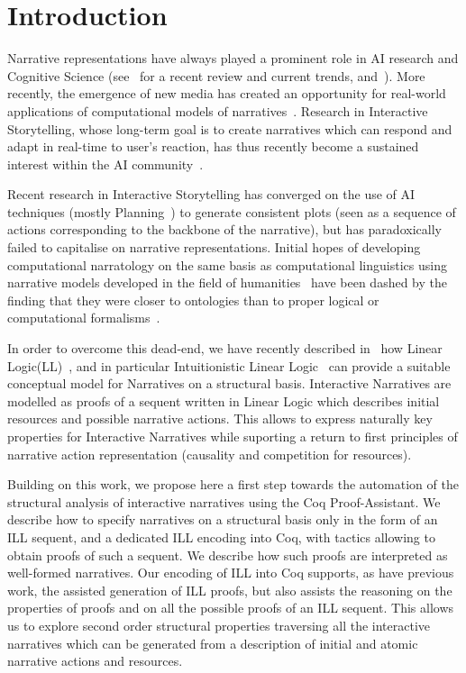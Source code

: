 \documentclass[runningheads,a4paper]{llncs}
\begin{document}
\section{Introduction}
%
Narrative representations have always played a prominent role in AI research and Cognitive Science (see~\cite{Richards09} for a recent review and current trends, and~\cite{AAAI10}). More recently, the emergence of new media has created an opportunity for real-world applications of computational models of narratives~\cite{Laurel93,Murray98}. Research in Interactive Storytelling, whose long-term goal is to create narratives which can respond and adapt in real-time to user's reaction, has thus recently become a sustained interest within the AI community~\cite{AAAI07,AAAI09}.

Recent research in Interactive Storytelling has converged on the use of AI techniques (mostly Planning~\cite{Young99}) to generate consistent plots (seen as a sequence of actions corresponding to the backbone of the narrative), but has paradoxically failed to capitalise on narrative representations. Initial hopes of developing computational narratology on the same basis as computational linguistics using narrative models developed in the field of humanities~\cite{Greimas66,Bremond73} have been dashed by the finding that they were closer to ontologies than to proper logical or computational formalisms~\cite{Cavazza06}.

In order to overcome this dead-end, we have recently described in~\cite{bosser10} how Linear Logic(LL)~\cite{GirardTCS87}, and in particular Intuitionistic Linear Logic~\cite{GirardILL87} can provide a suitable conceptual model for Narratives on a structural basis. Interactive Narratives are modelled as proofs of a sequent written in Linear Logic which describes initial resources and possible narrative actions. This allows to express naturally key properties for Interactive Narratives while suporting a return to first principles of narrative action representation (causality and competition for resources).

Building on this work, we propose here a first step towards the automation of the structural analysis of interactive narratives using the Coq Proof-Assistant. We describe how to specify narratives on a structural basis only in the form of an ILL sequent, and a dedicated ILL encoding into Coq, with tactics allowing to obtain proofs of such a sequent. We describe how such proofs are interpreted as well-formed narratives. Our encoding of ILL into Coq supports, as have previous work, the assisted generation of ILL proofs, but also assists the reasoning on the properties of proofs and on all the possible proofs of an ILL sequent. This allows us to explore second order structural properties traversing all the interactive narratives which can be generated from a description of initial and atomic narrative actions and resources.
\end{document}
